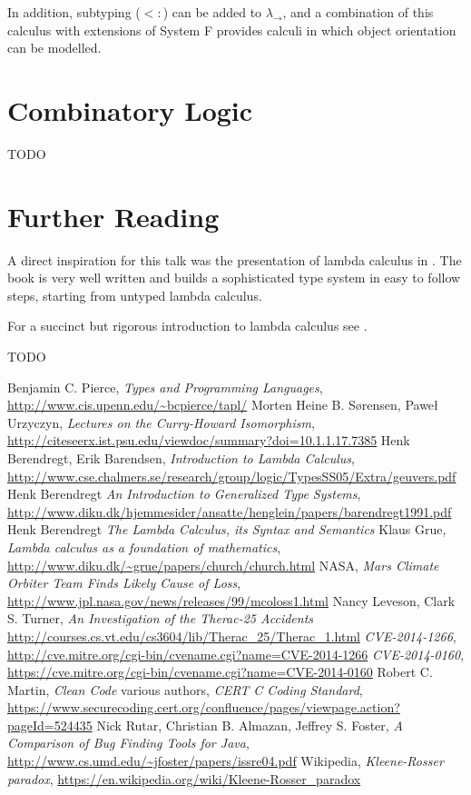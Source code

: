 \documentclass[11pt,twoside,a4paper]{article} %
\begin{document}
In addition, subtyping ($<:$) can be added to $\lambda_\rightarrow$, and a
combination of this calculus with extensions of System F provides calculi in
which object orientation can be modelled.

\section{Combinatory Logic}

TODO

\section{Further Reading}

A direct inspiration for this talk was the presentation of lambda calculus in
\cite{TAPL}. The book is very well written and builds a sophisticated type
system in easy to follow steps, starting from untyped lambda calculus. 

For a succinct but rigorous introduction to lambda calculus see \cite{bb00}.

TODO

\begin{thebibliography}{9}
 Benjamin C. Pierce, \emph{Types and Programming Languages},
\url{http://www.cis.upenn.edu/~bcpierce/tapl/}
 Morten Heine B. Sørensen, Paweł Urzyczyn, \emph{Lectures on the
Curry-Howard Isomorphism}, 
\url{http://citeseerx.ist.psu.edu/viewdoc/summary?doi=10.1.1.17.7385}
 Henk Berendregt, Erik Barendsen, \emph{Introduction to Lambda
Calculus}, 
\url{http://www.cse.chalmers.se/research/group/logic/TypesSS05/Extra/geuvers.pdf}
 Henk Berendregt \emph{An Introduction to Generalized Type Systems}, 
\url{http://www.diku.dk/hjemmesider/ansatte/henglein/papers/barendregt1991.pdf}
 Henk Berendregt \emph{The Lambda Calculus, its Syntax and
Semantics}
 Klaus Grue, \emph{Lambda calculus as a foundation of mathematics},
\url{http://www.diku.dk/~grue/papers/church/church.html}
 NASA, \emph{Mars Climate Orbiter Team Finds Likely Cause of Loss}, 
\url{http://www.jpl.nasa.gov/news/releases/99/mcoloss1.html}
 Nancy Leveson, Clark S. Turner, 
\emph{An Investigation of the Therac-25 Accidents}
\url{http://courses.cs.vt.edu/cs3604/lib/Therac_25/Therac_1.html}
 \emph{CVE-2014-1266},
\url{http://cve.mitre.org/cgi-bin/cvename.cgi?name=CVE-2014-1266}
 \emph{CVE-2014-0160}, 
\url{https://cve.mitre.org/cgi-bin/cvename.cgi?name=CVE-2014-0160}
 Robert C. Martin, \emph{Clean Code}
 various authors, \emph{CERT C Coding Standard}, 
\url{https://www.securecoding.cert.org/confluence/pages/viewpage.action?pageId=524435}
 Nick Rutar, Christian B. Almazan, Jeffrey S. Foster, \emph{A
Comparison of Bug Finding Tools for Java}, 
\url{http://www.cs.umd.edu/~jfoster/papers/issre04.pdf}
 Wikipedia, \emph{Kleene-Rosser paradox},
\url{https://en.wikipedia.org/wiki/Kleene-Rosser_paradox}
\end{thebibliography}
\end{document}
